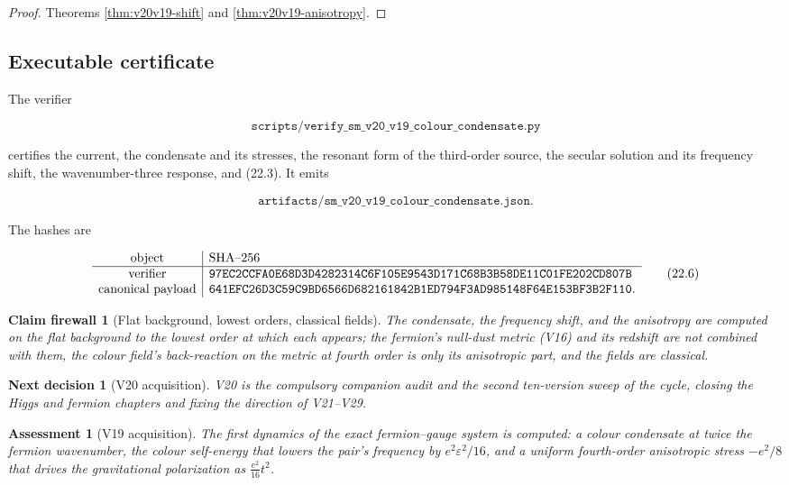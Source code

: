 \documentclass[11pt]{article}
\newtheorem{firewall}[theorem]{Claim firewall}
\newtheorem{decision}[theorem]{Next decision}
\newtheorem{assessment}[theorem]{Assessment}
\theoremstyle{remark}
\begin{document}
\begin{proof}
Theorems \ref{thm:v20v19-shift} and \ref{thm:v20v19-anisotropy}.
\end{proof}

\subsection{Executable certificate}

The verifier

\[
 \texttt{scripts/verify\_sm\_v20\_v19\_colour\_condensate.py}         \tag{22.4}
\]

certifies the current, the condensate and its stresses, the resonant
form of the third-order source, the secular solution and its
frequency shift, the wavenumber-three response, and (22.3).  It emits

\[
 \texttt{artifacts/sm\_v20\_v19\_colour\_condensate.json}.            \tag{22.5}
\]

The hashes are

\[
\begin{array}{c|l}
\hbox{object}&\hbox{SHA--256}\\ \hline
\hbox{verifier}&
\texttt{97EC2CCFA0E68D3D4282314C6F105E9543D171C68B3B58DE11C01FE202CD807B}\\
\hbox{canonical payload}&
\texttt{641EFC26D3C59C9BD6566D682161842B1ED794F3AD985148F64E153BF3B2F110}.
\end{array}                                                     \tag{22.6}
\]

\begin{firewall}[Flat background, lowest orders, classical fields]
\label{fire:v20v19}
The condensate, the frequency shift, and the anisotropy are computed
on the flat background to the lowest order at which each appears;
the fermion's null-dust metric (V16) and its redshift are not
combined with them, the colour field's back-reaction on the metric at
fourth order is only its anisotropic part, and the fields are
classical.
\end{firewall}

\begin{decision}[V20 acquisition]
\label{dec:v20v19-next}
V20 is the compulsory companion audit and the second ten-version
sweep of the cycle, closing the Higgs and fermion chapters and fixing
the direction of V21--V29.
\end{decision}

\begin{assessment}[V19 acquisition]
\label{ass:v20v19}
The first dynamics of the exact fermion--gauge system is computed:
a colour condensate at twice the fermion wavenumber, the colour
self-energy that lowers the pair's frequency by \(e^2\varepsilon^2/16\),
and a uniform fourth-order anisotropic stress \(-e^2/8\) that drives
the gravitational polarization as \(\tfrac{e^2}{16}t^2\).
\end{assessment}
\end{document}
